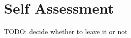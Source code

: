 \documentclass{article}
\begin{document}

\section{Self Assessment}
TODO: decide whether to leave it or not


\medskip

\small


\end{document}
